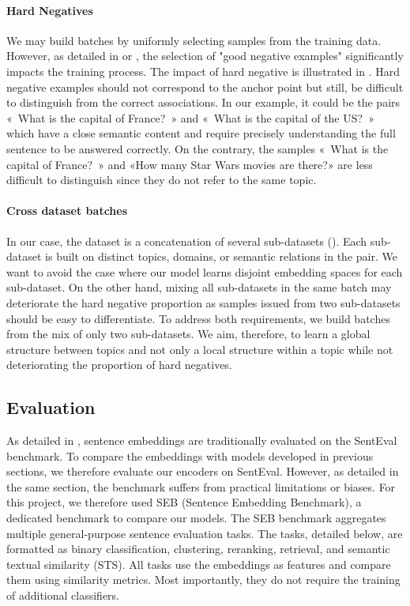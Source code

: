 \paragraph{Hard Negatives} We may build batches by uniformly selecting samples from the training data. However, as detailed in \textcite{robinson_21} or \textcite{qu_21}, the selection of "good negative examples" significantly impacts the training process. The impact of hard negative is illustrated in .
Hard negative examples should not correspond to the anchor point but still, be difficult to distinguish from the correct associations. 
In our example, it could be the pairs «~What is the capital of France?~» and «~What is the capital of the US?~» which have a close semantic content and require precisely understanding the full sentence to be answered correctly. On the contrary, the samples «~What is the capital of France?~» and «How many Star Wars movies are there?» are less difficult to distinguish since they do not refer to the same topic.

\paragraph{Cross dataset batches} In our case, the dataset is a concatenation of several sub-datasets (). Each sub-dataset is built on distinct topics, domains, or semantic relations in the pair. We want to avoid the case where our model learns disjoint embedding spaces for each sub-dataset. On the other hand, mixing all sub-datasets in the same batch may deteriorate the hard negative proportion as samples issued from two sub-datasets should be easy to differentiate. To address both requirements, we build batches from the mix of only two sub-datasets. We aim, therefore, to learn a global structure between topics and not only a local structure within a topic while not deteriorating the proportion of hard negatives.

\subsection{Evaluation}

As detailed in , sentence embeddings are traditionally evaluated on the SentEval benchmark. To compare the embeddings with models developed in previous sections, we therefore evaluate our encoders on SentEval. However, as detailed in the same section, the benchmark suffers from practical limitations or biases. For this project, we therefore used SEB (Sentence Embedding Benchmark), a dedicated benchmark to compare our models. The SEB benchmark aggregates multiple general-purpose sentence evaluation tasks. The tasks, detailed below, are formatted as binary classification, clustering, reranking, retrieval, and semantic textual similarity (STS). All tasks use the embeddings as features and compare them using similarity metrics. Most importantly, they do not require the training of additional classifiers.

